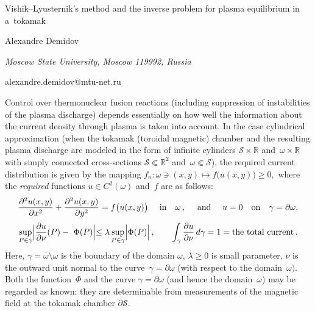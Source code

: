 \documentclass[10pt,a4paper]{article}
\def\R{\mathbb{R}}
\begin{document}
\begin{center}

{\Large Vishik--Lyusternik's method and the inverse problem for plasma equilibrium in a~tokamak}
\bigskip

{\sc Alexandre Demidov}

{\small\it Moscow State University, Moscow 119992, Russia}

{\small\rm alexandre.demidov@mtu-net.ru}

\end{center}

\bigskip


Control over thermonuclear fusion reactions
(including suppression of instabilities of the plasma discharge)
depends essentially on how well the information about the current
density through plasma is taken into account. In the case
cylindrical approximation (when the tokamak (toroidal magnetic)
chamber and the resulting plasma discharge are modeled in the form
of infinite cylinders ${\mathcal S}\times\R$ and~$\omega\times\R$
with simply connected cross-sections ${\mathcal S}\Subset\R^2$
and~$\omega\Subset{\mathcal S}$), the required current
distribution is given by the mapping
$
f_{u}:\omega\ni (x,y)\mapsto f\bigl(u(x,y)\bigl)\ge 0,
$
where the \textit{required} functions $u\in C^2(\omega)$ and~$f$
are as follows:
\begin{equation*}\label{0.2}
\frac{\partial^2 u(x,y)}{\partial x^2}+\frac{\partial^2 u(x,y)}{\partial y^2}=f\bigl(u(x,y)\bigl)
\quad \ {\rm in}\quad \omega\,,\quad \ {\rm and}\quad \ u=0\quad {\rm on}\quad
\gamma=\partial\omega,
\end{equation*}
\begin{equation*}\label{0.3}
\sup\limits_{P\in\gamma}\Bigl|\frac{\partial
u}{\partial\nu}(P)-~\Phi(P)\Bigl|\le\lambda\sup\limits_{P\in\gamma}\Bigl|\Phi(P)\Bigl|
\,,\qquad \int_{\gamma}\frac{\partial u}{\partial \nu}\,d\gamma=1
=\mbox{the total current}\,.
\end{equation*}
Here, $\gamma=\overline{\omega}\setminus\omega$ is the boundary of
the domain $\omega$, $\lambda\ge 0$ is small parameter, $\nu$ is
the outward  unit normal to the curve~$\gamma=\partial\omega$
(with respect to the domain~$\omega)$. Both the function~$\Phi$
and the curve $\gamma=\partial\omega$ (and hence the
domain~$\omega$) may be regarded as known: they are determinable
from measurements of the magnetic field at the tokamak chamber
$\partial {\mathcal S}.$
\end{document}
